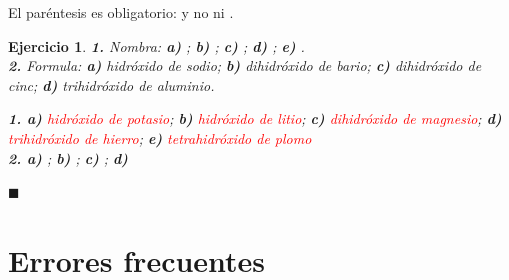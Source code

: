 \documentclass[12pt]{article}
\theoremstyle{mygreennumbox}
\newtheorem{ejercicioT}{Ejercicio}[section]
\newenvironment{exercise}{\begin{eBoxmygreen}\begin{ejercicioT}}{\hfill{\color{mygreen}\tiny\ensuremath{\blacksquare}}\end{ejercicioT}\end{eBoxmygreen}}
\newcommand{\mal}[1]{\textcolor{red}{\sout{#1}}}
\begin{document}
\begin{marker}
    El paréntesis es obligatorio:  y no \mal{} ni \mal{}.
\end{marker}

\begin{exercise}
    \textbf{1.} Nombra: \textbf{a)} ; \textbf{b)} ; \textbf{c)} ; \textbf{d)} ; \textbf{e)} .\\
    \textbf{2.} Formula: \textbf{a)} hidróxido de sodio; \textbf{b)} dihidróxido de bario; \textbf{c)} dihidróxido de cinc; \textbf{d)} trihidróxido de aluminio.
    \begin{solu}
        \textbf{1. a)} \textcolor{red}{hidróxido de potasio}; \textbf{b)} \textcolor{red}{hidróxido de litio}; \textbf{c)} \textcolor{red}{dihidróxido de magnesio}; \textbf{d)} \textcolor{red}{trihidróxido de hierro}; \textbf{e)} \textcolor{red}{tetrahidróxido de plomo}\\
        \textbf{2. a)} \textcolor{red}{}; \textbf{b)} \textcolor{red}{}; \textbf{c)} \textcolor{red}{}; \textbf{d)} \textcolor{red}{}
    \end{solu}
\end{exercise}

\section{Errores frecuentes}
\end{document}
